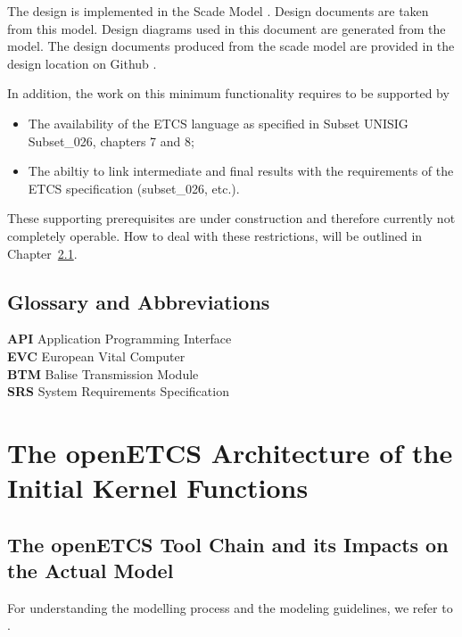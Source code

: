 \documentclass{template/openetcs_report}
\begin{document}
The design is implemented in the Scade Model \cite{scade-model}. Design documents are taken from this model. Design diagrams used in this document are generated from the model. The design documents produced from the scade model are provided in the design location on Github \cite{designFI}.

In addition, the work on this minimum functionality requires to be supported by
\begin{itemize}
	\item The availability of the ETCS language as specified in Subset UNISIG Subset\_026, chapters 7 and 8;
	\item The abiltiy to link intermediate and final results with the requirements of the ETCS specification (subset\_026, etc.). 
\end{itemize}
These supporting prerequisites are under construction and therefore currently not completely operable. How to deal with these restrictions, will be outlined in Chapter~\ref{}.

\section{Glossary and Abbreviations}

\textbf{API} Application Programming Interface\\
\textbf{EVC} European Vital Computer\\
\textbf{BTM} Balise Transmission Module\\
\textbf{SRS} System Requirements Specification\\





\chapter{The openETCS Architecture of the Initial Kernel Functions}

\section{The openETCS Tool Chain and its Impacts on the Actual Model}

For understanding the modelling process and the modeling guidelines, we refer to \cite{wp3-dow}. 
\end{document}
